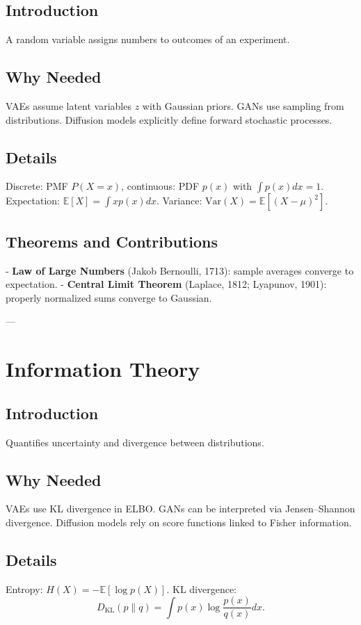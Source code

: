 \documentclass[11pt]{book}
\begin{document}
\subsection{Introduction}
A random variable assigns numbers to outcomes of an experiment.

\subsection{Why Needed}
VAEs assume latent variables $z$ with Gaussian priors. GANs use sampling from distributions. Diffusion models explicitly define forward stochastic processes.

\subsection{Details}
Discrete: PMF $P(X=x)$, continuous: PDF $p(x)$ with $\int p(x)dx=1$.  
Expectation: $\mathbb{E}[X] = \int x p(x) dx$.  
Variance: $\mathrm{Var}(X) = \mathbb{E}[(X-\mu)^2]$.

\subsection{Theorems and Contributions}
- \textbf{Law of Large Numbers} (Jakob Bernoulli, 1713): sample averages converge to expectation.  
- \textbf{Central Limit Theorem} (Laplace, 1812; Lyapunov, 1901): properly normalized sums converge to Gaussian.

---

\section{Information Theory}
\subsection{Introduction}
Quantifies uncertainty and divergence between distributions.

\subsection{Why Needed}
VAEs use KL divergence in ELBO. GANs can be interpreted via Jensen–Shannon divergence. Diffusion models rely on score functions linked to Fisher information.

\subsection{Details}
Entropy: $H(X) = -\mathbb{E}[\log p(X)]$.  
KL divergence:
\[
D_{\mathrm{KL}}(p\|q) = \int p(x)\log\frac{p(x)}{q(x)}dx.
\]
\end{document}
